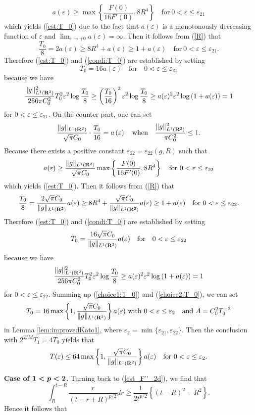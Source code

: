 \documentclass[a4paper,12pt]{article}
\numberwithin{equation}{section}
\def\R{{\bf R}}
\def\d{\displaystyle}
\def\e{{\varepsilon}}
\def\v#1{\mbox{\boldmath $#1$}}
\begin{document}
\[
a(\e)\ge\max\left\{\frac{F(0)}{16F'(0)},8R^4\right\}
\quad\mbox{for}\ 0<\e\le\e_{21}
\]
which yields (\ref{est:T_0})
due to the fact that $a(\e)$ is a monotonously decreasing function of $\e$
and $\d\lim_{\e\rightarrow+0}a(\e)=\infty$.
Then it follows from (\ref{R}) that
\[
\frac{T_0}{8}=2a(\e)\ge8R^4+a(\e)\ge1+a(\e)
\quad\mbox{for}\ 0<\e\le\e_{21}.
\]
Therefore (\ref{est:T_0}) and (\ref{condi:T_0}) are established by setting
\begin{equation}
\label{choice1:T_0}
T_0=16a(\e)\quad\mbox{for}\quad0<\e\le\e_{21}
\end{equation}
because we have
\[
\frac{\|g\|^2_{L^1(\R^2)}}{256\pi C_0^2}T_0^2\e^2\log\frac{T_0}{8}
\ge\left(\frac{T_0}{16}\right)^2\e^2\log\frac{T_0}{8}
\ge a(\e)^2\e^2\log\left(1+a(\e)\right)=1
\]
for $0<\e\le\e_{21}$.
On the counter part, one can set
\[
\frac{\|g\|_{L^1(\R^2)}}{\sqrt{\pi}C_0}\cdot
\frac{T_0}{16}=a\left(\e\right)\quad\mbox{when}
\quad\frac{\|g\|^2_{L^1(\R^2)}}{\pi C_0^2}\le1.
\]
Because there exists a positive constant $\e_{22}=\e_{22}(g,R)$ such that
\[
a(\e)\ge\frac{\|g\|_{L^1(\R^2)}}{\sqrt{\pi}C_0}\max\left\{\frac{F(0)}{16F'(0)},8R^4\right\}
\quad\mbox{for}\ 0<\e\le\e_{22}
\]
which yields (\ref{est:T_0}).
Then it follows from (\ref{R}) that
\[
\frac{T_0}{8}=\frac{2\sqrt{\pi}C_0}{\|g\|_{L^1(\R^2)}}a(\e)
\ge8R^4+\frac{\sqrt{\pi}C_0}{\|g\|_{L^1(\R^2)}}a(\e)\ge 1+a(\e)\quad\mbox{for}\ 0<\e\le\e_{22}.
\]
Therefore (\ref{est:T_0}) and (\ref{condi:T_0}) are established by setting
\begin{equation}
\label{choice2:T_0}
T_0=\frac{16\sqrt{\pi}C_0}{\|g\|_{L^1(\R^2)}}a(\e)\quad\mbox{for}\quad0<\e\le\e_{22}
\end{equation}
because we have
\[
\frac{\|g\|^2_{L^1(\R^2)}}{256\pi C_0^2}T_0^2\e^2\log\frac{T_0}{8}
\ge a(\e)^2\e^2\log\left(1+a(\e)\right)=1
\]
for $0<\e\le\e_{22}$.
Summing up (\ref{choice1:T_0}) and (\ref{choice2:T_0}),
we can set
\[
T_0=16\max\left\{1,\frac{\sqrt{\pi}C_0}{\|g\|_{L^1(\R^2)}}\right\}a(\e)
\ \mbox{with}\ 0<\e\le\e_2
\quad\mbox{and}\ A=C_0^2T_0^{-2}
\]
in Lemma \ref{lem:improvedKato1}, where $\e_2=\min\{\e_{21},\e_{22}\}$.
Then the conclusion with $2^{2/M}T_1=4T_0$ yields that
\[
T(\e)\le64\max\left\{1,\frac{\sqrt{\pi}C_0}{\|g\|_{L^1(\R^2)}}\right\}a(\e)
\quad\mbox{for}\ 0<\e\le\e_2.
\]
\par\noindent
{\bf Case of $\v{1<p<2}$.} Turning back to (\ref{est_F''_2d}),
we find that
\[
\int_R^{t-R}\frac{r}{(t-r+R)^{p/2}}dr
\ge\frac{1}{2t^{p/2}}\left\{(t-R)^2-R^2\right\}.
\]
Hence it follows that
\end{document}
